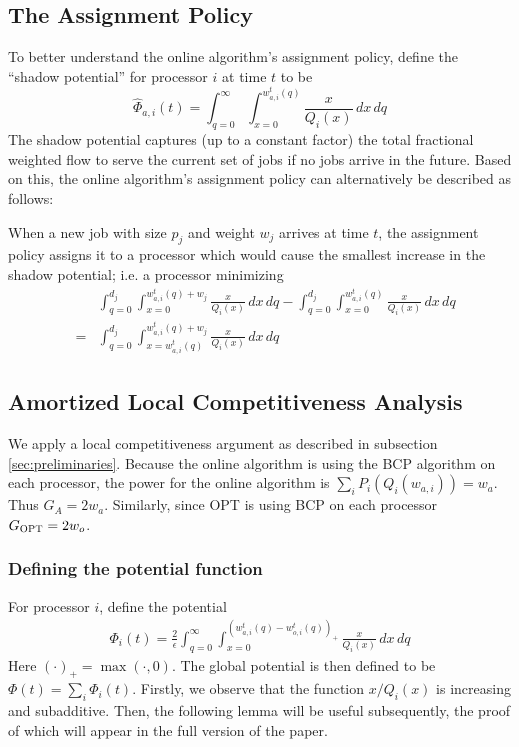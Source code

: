 \documentclass[11pt]{article}
\newcommand{\opt}{\textrm{\sc OPT}\xspace}
\newcommand{\tsty}{}
\newcommand{\const}{\frac{2}{\epsilon}}
\begin{document}
\subsection{The Assignment Policy}

To better understand the online algorithm's assignment policy,
define the ``shadow potential'' for processor $i$ at time $t$ to be
\begin{equation}
  \label{eq:shadow-wtd} \tsty {\widehat\Phi}_{a,i}(t) = \int_{q =
    0}^{\infty} \int_{x = 0}^{w^{t}_{a,i}(q)} \frac{x}{Q_i(x)} \, dx\, dq
\end{equation}
The shadow potential captures (up to a constant factor) the total fractional weighted flow to serve the current set of jobs if no jobs arrive in the
future.
Based on this, the online algorithm's assignment policy can alternatively be described as follows:


\medskip {} When a new job with size $p_j$ and weight $w_j$
arrives at time $t$, the assignment policy assigns it
to a processor which would cause the smallest increase in the
shadow potential; i.e. a processor minimizing
\begin{eqnarray*}
&&\int_{q=0}^{d_j} \int_{x=0}^{w^{t}_{a,i}(q) + w_j } \frac{x}{Q_i(x)} \,dx\,dq-
\int_{q=0}^{d_j} \int_{x=0}^{w^{t}_{a,i}(q) } \frac{x}{Q_i(x)} \,dx\,dq\\
&=& \int_{q=0}^{d_j} \int_{x = w^{t}_{a,i}(q)}^{ w^{t}_{a,i}(q) + w_j } \frac{x}{Q_i(x)} \,dx\,dq
\end{eqnarray*}





\subsection{Amortized Local Competitiveness Analysis}




We apply a local competitiveness argument as described in subsection \ref{sec:preliminaries}.
Because the online algorithm is using the BCP algorithm on each processor, the power
for the online algorithm is
$\sum_i P_i(Q_i(w_{a,i}))=w_{a}$. Thus $G_A = 2w_{a}$. Similarly, since \opt is using BCP on
each processor $G_{\opt}= 2 w_{o}$.

\subsubsection{Defining the potential function}
For processor $i$, define the potential
\begin{gather}
  \tsty \Phi_i(t) = \const \int_{q=0}^{\infty} \int_{x=0}^{(w_{a,i}^{t}(q) -
    w_{o,i}^{t}(q))_+} \frac{x}{Q_i(x)} \,dx\,dq \label{eq:pot-wf}
\end{gather}
Here $(\cdot)_+ = \max(\cdot, 0)$.
The global potential is then defined to be $\Phi(t) = \sum_i \Phi_i(t)$.
Firstly, we observe that the function $x/Q_i(x)$ is
increasing and subadditive.
Then, the following lemma
will be useful subsequently, the proof of which will appear in the full version of the paper.
\end{document}

